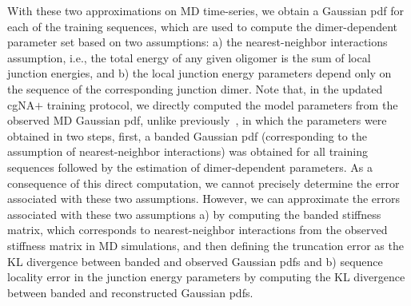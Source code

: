 With these two approximations on MD time-series, we obtain a Gaussian pdf for each of the training sequences, which are used to compute the dimer-dependent parameter set based on two assumptions: a) the nearest-neighbor interactions assumption, i.e., the total energy of any given oligomer is the sum of local junction energies, and b) the local junction energy parameters depend only on the sequence of the corresponding junction dimer.
Note that, in the updated cgNA$+$ training protocol, we directly computed the model parameters from the observed MD Gaussian pdf, unlike previously~\cite{patelithesis}, in which the parameters were obtained in two steps, first, a banded Gaussian pdf (corresponding to the assumption of nearest-neighbor interactions) was obtained for all training sequences followed by the estimation of dimer-dependent parameters.
As a consequence of this direct computation, we cannot precisely determine the error associated with these two assumptions. 
However, we can approximate the errors associated with these two assumptions a) by computing the banded stiffness matrix, which corresponds to nearest-neighbor interactions from the observed stiffness matrix in MD simulations, and then defining the truncation error as the KL divergence between banded and observed Gaussian pdfs and b) sequence locality error in the junction energy parameters by computing the KL divergence between banded and reconstructed Gaussian pdfs.

